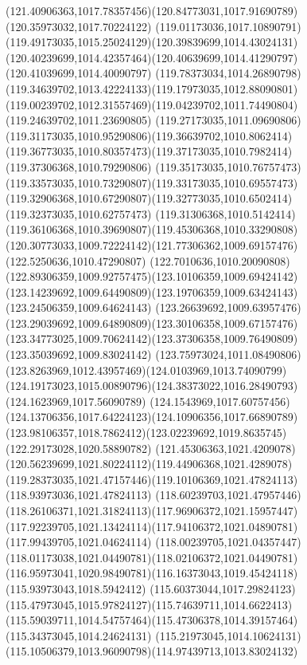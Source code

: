 {{  \curveto(121.40906363,1017.78357456)(120.84773031,1017.91690789)(120.35973032,1017.70224122)
  \curveto(119.01173036,1017.10890791)(119.49173035,1015.25024129)(120.39839699,1014.43024131)
  \curveto(120.40239699,1014.42357464)(120.40639699,1014.41290797)(120.41039699,1014.40090797)
  \curveto(119.78373034,1014.26890798)(119.34639702,1013.42224133)(119.17973035,1012.88090801)
  \curveto(119.00239702,1012.31557469)(119.04239702,1011.74490804)(119.24639702,1011.23690805)
  \curveto(119.27173035,1011.09690806)(119.31173035,1010.95290806)(119.36639702,1010.8062414)
  \curveto(119.36773035,1010.80357473)(119.37173035,1010.7982414)(119.37306368,1010.79290806)
  \curveto(119.35173035,1010.76757473)(119.33573035,1010.73290807)(119.33173035,1010.69557473)
  \curveto(119.32906368,1010.67290807)(119.32773035,1010.6502414)(119.32373035,1010.62757473)
  \curveto(119.31306368,1010.5142414)(119.36106368,1010.39690807)(119.45306368,1010.33290808)
  \curveto(120.30773033,1009.72224142)(121.77306362,1009.69157476)(122.5250636,1010.47290807)
  \curveto(122.7010636,1010.20090808)(122.89306359,1009.92757475)(123.10106359,1009.69424142)
  \curveto(123.14239692,1009.64490809)(123.19706359,1009.63424143)(123.24506359,1009.64624143)
  \curveto(123.26639692,1009.63957476)(123.29039692,1009.64890809)(123.30106358,1009.67157476)
  \curveto(123.34773025,1009.70624142)(123.37306358,1009.76490809)(123.35039692,1009.83024142)
  \curveto(123.75973024,1011.08490806)(123.8263969,1012.43957469)(124.0103969,1013.74090799)
  \curveto(124.19173023,1015.00890796)(124.38373022,1016.28490793)(124.1623969,1017.56090789)
  \curveto(124.1543969,1017.60757456)(124.13706356,1017.64224123)(124.10906356,1017.66890789)
  \curveto(123.98106357,1018.7862412)(123.02239692,1019.8635745)(122.29173028,1020.58890782)
  \curveto(121.45306363,1021.4209078)(120.56239699,1021.80224112)(119.44906368,1021.4289078)
  \curveto(119.28373035,1021.47157446)(119.10106369,1021.47824113)(118.93973036,1021.47824113)
  \curveto(118.60239703,1021.47957446)(118.26106371,1021.31824113)(117.96906372,1021.15957447)
  \curveto(117.92239705,1021.13424114)(117.94106372,1021.04890781)(117.99439705,1021.04624114)
  \curveto(118.00239705,1021.04357447)(118.01173038,1021.04490781)(118.02106372,1021.04490781)
  \curveto(116.95973041,1020.98490781)(116.16373043,1019.45424118)(115.93973043,1018.5942412)
  \curveto(115.60373044,1017.29824123)(115.47973045,1015.97824127)(115.74639711,1014.6622413)
  \curveto(115.59039711,1014.54757464)(115.47306378,1014.39157464)(115.34373045,1014.24624131)
  \curveto(115.21973045,1014.10624131)(115.10506379,1013.96090798)(114.97439713,1013.83024132)
}}
